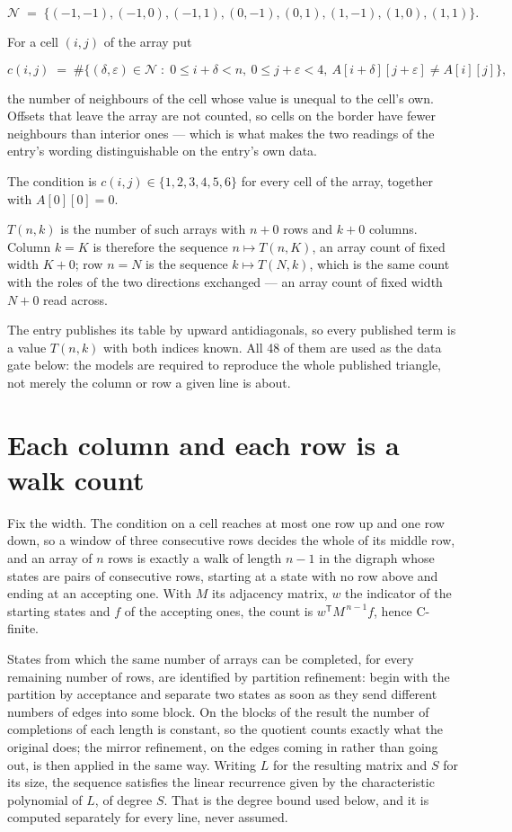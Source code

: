 \documentclass[11pt]{article}
\theoremstyle{definition}
\begin{document}
\[\mathcal{N} \;=\; \{(-1,-1), (-1,0), (-1,1), (0,-1), (0,1), (1,-1), (1,0), (1,1)\}.\]

For a cell $(i,j)$ of the array put

\[c(i,j) \;=\; \#\bigl\{(\delta,\varepsilon)\in\mathcal{N} \;:\; 0\le i+\delta<n,\ 0\le j+\varepsilon<4,\ A[i+\delta][j+\varepsilon] \neq A[i][j]\bigr\},\]

the number of neighbours of the cell whose value is unequal to the cell's own. Offsets that leave the array are not counted, so cells on the border have fewer neighbours than interior ones --- which is what makes the two readings of the entry's wording distinguishable on the entry's own data.

The condition is $c(i,j) \in \{1, 2, 3, 4, 5, 6\}$ for every cell of the array, together with $A[0][0]=0$.

$T(n,k)$ is the number of such arrays with $n + 0$ rows and $k + 0$ columns. Column $k = K$ is therefore the sequence $n \mapsto T(n,K)$, an array count of fixed width $K + 0$; row $n = N$ is the sequence $k \mapsto T(N,k)$, which is the same count with the roles of the two directions exchanged --- an array count of fixed width $N + 0$ read across.

The entry publishes its table by upward antidiagonals, so every published term is a value $T(n,k)$ with both indices known. All 48 of them are used as the data gate below: the models are required to reproduce the whole published triangle, not merely the column or row a given line is about.

\section{Each column and each row is a walk count}

Fix the width. The condition on a cell reaches at most one row up and one row down, so a window of three consecutive rows decides the whole of its middle row, and an array of $n$ rows is exactly a walk of length $n-1$ in the digraph whose states are pairs of consecutive rows, starting at a state with no row above and ending at an accepting one. With $M$ its adjacency matrix, $w$ the indicator of the starting states and $f$ of the accepting ones, the count is $w^{\mathsf T}M^{\,n-1}f$, hence C-finite.

States from which the same number of arrays can be completed, for every remaining number of rows, are identified by partition refinement: begin with the partition by acceptance and separate two states as soon as they send different numbers of edges into some block. On the blocks of the result the number of completions of each length is constant, so the quotient counts exactly what the original does; the mirror refinement, on the edges coming in rather than going out, is then applied in the same way. Writing $L$ for the resulting matrix and $S$ for its size, the sequence satisfies the linear recurrence given by the characteristic polynomial of $L$, of degree $S$. That is the degree bound used below, and it is computed separately for every line, never assumed.
\end{document}
